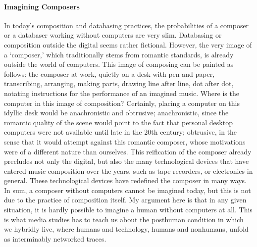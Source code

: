 
\paragraph{Imagining Composers}
In today's composition and databasing practices, the probabilities of a composer or a databaser working without computers are very slim. Databasing or composition outside the digital seems rather fictional. However, the very image of a `composer,' which traditionally stems from romantic standards, is already outside the world of computers. This image of composing can be painted as follows: the composer at work, quietly on a desk with pen and paper, transcribing, arranging, making parts, drawing line after line, dot after dot, notating instructions for the performance of an imagined music. Where is the computer in this image of composition? Certainly, placing a computer on this idyllic desk would be anachronistic and obtrusive; anachronistic, since the romantic quality of the scene would point to the fact that personal desktop computers were not available until late in the 20th century; obtrusive, in the sense that it would attempt against this romantic composer, whose motivations were of a different nature than ourselves. This reification of the composer already precludes not only the digital, but also the many technological devices that have entered music composition over the years, such as tape recorders, or electronics in general. These technological devices have redefined the composer in many ways. In sum, a composer without computers cannot be imagined today, but this is not due to the practice of composition itself. My argument here is that in any given situation, it is hardly possible to imagine a human without computers at all. This is what media studies has to teach us about the posthuman condition in which we hybridly live, where humans and technology, humans and nonhumans, unfold as interminably networked traces.


